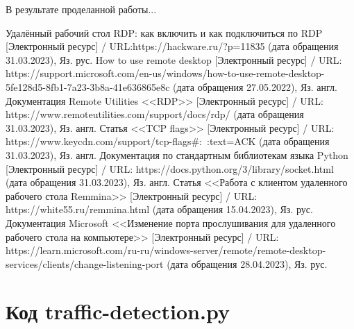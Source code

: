 \documentclass[bachelor, och, coursework]{SCWorks}
\begin{document}



\conclusion
  
  В результате проделанной работы...

  \begin{thebibliography}{15}
    Удалённый рабочий стол RDP: как включить и как подключиться по RDP [Электронный ресурс] / URL:https://hackware.ru/?p=11835 (дата обращения 31.03.2023), Яз. рус.
    How to use remote desktop [Электронный ресурс] / URL: https://support.microsoft.com/en-us/windows/how-to-use-remote-desktop-5fe128d5-8fb1-7a23-3b8a-41e636865e8c (дата обращения 27.05.2022), Яз. англ.
    Документация Remote Utilities <<RDP>> [Электронный ресурс] / URL:  https://www.remoteutilities.com/support/docs/rdp/ (дата обращения 31.03.2023), Яз. англ.
    Статья <<TCP flags>> [Электронный ресурс] / URL: https://www.keycdn.com/support/tcp-flags\#:~:text=ACK
    (дата обращения 31.03.2023), Яз. англ.
    Документация по стандартным библиотекам языка Python [Электронный ресурс] / URL: https://docs.python.org/3/library/socket.html (дата обращения 31.03.2023), Яз. англ.
    Статья <<Работа с клиентом удаленного рабочего стола Remmina>> [Электронный ресурс] / URL: https://white55.ru/remmina.html
    (дата обращения 15.04.2023), Яз. рус.
    Документация Microsoft <<Изменение порта прослушивания для удаленного рабочего стола на компьютере>> [Электронный ресурс] / URL: https://learn.microsoft.com/ru-ru/windows-server/remote/remote-desktop-services/clients/change-listening-port
    (дата обращения 28.04.2023), Яз. рус.
  \end{thebibliography}

  \appendix

    \section{Код traffic-detection.py}
    \inputminted[fontsize=\footnotesize, linenos]{Python}{code/traffic-detection.py}
\end{document}

